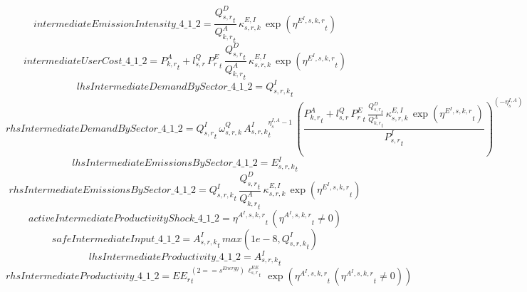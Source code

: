 \begin{dmath*}
intermediateEmissionIntensity\_4\_1\_2 = \frac{{{Q^{D}_{s,r}}}_{t}}{{{Q^{A}_{k,r}}}_{t}}\, {{\kappa^{E,I}_{s,r,k}}}\, \exp\left({{\eta^{E^{I},s,k,r}}}_{t}\right)
\end{dmath*}
\begin{dmath*}
intermediateUserCost\_4\_1\_2 = {{P^{A}_{k,r}}}_{t}+{{l^{Q}_{s,r}}}\, {{P^E_r}}_{t}\, \frac{{{Q^{D}_{s,r}}}_{t}}{{{Q^{A}_{k,r}}}_{t}}\, {{\kappa^{E,I}_{s,r,k}}}\, \exp\left({{\eta^{E^{I},s,k,r}}}_{t}\right)
\end{dmath*}
\begin{dmath*}
lhsIntermediateDemandBySector\_4\_1\_2 = {{Q^{I}_{s,r,k}}}_{t}
\end{dmath*}
\begin{dmath*}
rhsIntermediateDemandBySector\_4\_1\_2 = {{Q^{I}_{s,r}}}_{t}\, {{\omega^{Q}_{s,r,k}}}\, {{A^{I}_{s,r,k}}}_{t}^{{{\eta^{I,A}_{s}}}-1}\, \left(\frac{{{P^{A}_{k,r}}}_{t}+{{l^{Q}_{s,r}}}\, {{P^E_r}}_{t}\, \frac{{{Q^{D}_{s,r}}}_{t}}{{{Q^{A}_{k,r}}}_{t}}\, {{\kappa^{E,I}_{s,r,k}}}\, \exp\left({{\eta^{E^{I},s,k,r}}}_{t}\right)}{{{P^{I}_{s,r}}}_{t}}\right)^{\left(-{{\eta^{I,A}_{s}}}\right)}
\end{dmath*}
\begin{dmath*}
lhsIntermediateEmissionsBySector\_4\_1\_2 = {{E^I_{s,r,k}}}_{t}
\end{dmath*}
\begin{dmath*}
rhsIntermediateEmissionsBySector\_4\_1\_2 = {{Q^{I}_{s,r,k}}}_{t}\, \frac{{{Q^{D}_{s,r}}}_{t}}{{{Q^{A}_{k,r}}}_{t}}\, {{\kappa^{E,I}_{s,r,k}}}\, \exp\left({{\eta^{E^{I},s,k,r}}}_{t}\right)
\end{dmath*}
\begin{dmath*}
activeIntermediateProductivityShock\_4\_1\_2 = {{\eta^{A^{I},s,k,r}}}_{t}\, \left({{\eta^{A^{I},s,k,r}}}_{t}\neq 0\right)
\end{dmath*}
\begin{dmath*}
safeIntermediateInput\_4\_1\_2 = {{A^{I}_{s,r,k}}}_{t}\, max(1e-8,{{Q^{I}_{s,r,k}}}_{t})
\end{dmath*}
\begin{dmath*}
lhsIntermediateProductivity\_4\_1\_2 = {{A^{I}_{s,r,k}}}_{t}
\end{dmath*}
\begin{dmath*}
rhsIntermediateProductivity\_4\_1\_2 = {{EE_r}}_{t}^{\left(2=={{s^{Energy}}}\right)\, {{\ell^{EE}_{s,r}}}_{t}}\, \exp\left({{\eta^{A^{I},s,k,r}}}_{t}\, \left({{\eta^{A^{I},s,k,r}}}_{t}\neq 0\right)\right)
\end{dmath*}
